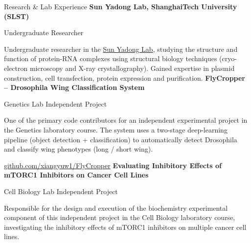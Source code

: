 \begin{rubric}{Research \& Lab Experience}
\entry*[2024 -- Present]%
	\textbf{Sun Yadong Lab, ShanghaiTech University (SLST)}\par
	Undergraduate Researcher\par
	Undergraduate researcher in the \href{https://slst.shanghaitech.edu.cn/syd/main.htm}{Sun Yadong Lab}, studying the structure and function of protein-RNA complexes using structural biology techniques (cryo-electron microscopy and X-ray crystallography). Gained expertise in plasmid construction, cell transfection, protein expression and purification.
%
\entry*[]%
	\textbf{FlyCropper -- Drosophila Wing Classification System}\par
	Genetics Lab Independent Project\par
	One of the primary code contributors for an independent experimental project in the Genetics laboratory course. The system uses a two-stage deep-learning pipeline (object detection + classification) to automatically detect Drosophila and classify wing phenotypes (long / short wing).\par
	\href{https://github.com/xiangyuw1/FlyCropper}{github.com/xiangyuw1/FlyCropper}
%
\entry*[]%
	\textbf{Evaluating Inhibitory Effects of mTORC1 Inhibitors on Cancer Cell Lines}\par
	Cell Biology Lab Independent Project\par
	Responsible for the design and execution of the biochemistry experimental component of this independent project in the Cell Biology laboratory course, investigating the inhibitory effects of mTORC1 inhibitors on multiple cancer cell lines.
%
\end{rubric}